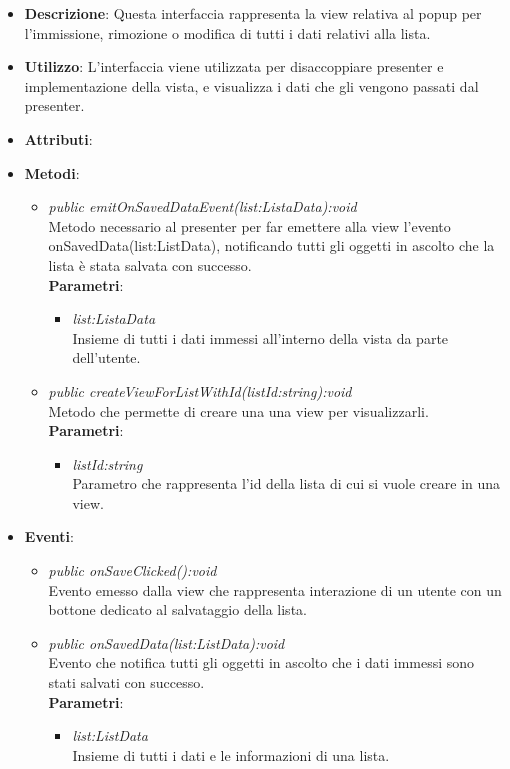 \begin{itemize}
\item \textbf{Descrizione}: Questa interfaccia rappresenta la view relativa al popup per l'immissione, rimozione o modifica di tutti i dati relativi alla lista.
\item \textbf{Utilizzo}: L'interfaccia viene utilizzata per disaccoppiare presenter e implementazione della vista, e visualizza i dati che gli vengono passati dal presenter.
\item \textbf{Attributi}: 
\item \textbf{Metodi}:
	\begin{itemize}	
	\item \textit{public emitOnSavedDataEvent(list:ListaData):void}\\
	Metodo necessario al presenter per far emettere alla view l'evento onSavedData(list:ListData), notificando tutti gli oggetti in ascolto che la lista è stata salvata con successo.
			\\ \textbf{Parametri}: \begin{itemize}
			\item \textit{list:ListaData}\\
			Insieme di tutti i dati immessi all'interno della vista da parte dell'utente.
			\end{itemize} 
	\item \textit{public createViewForListWithId(listId:string):void}\\
	Metodo che permette di creare una una view per visualizzarli.
			\\ \textbf{Parametri}: \begin{itemize}
			\item \textit{listId:string}\\
			Parametro che rappresenta l'id della lista di cui si vuole creare in una view.
			\end{itemize} 
	\end{itemize}
\item \textbf{Eventi}:
	\begin{itemize}
	\item \textit{public onSaveClicked():void}\\
	Evento emesso dalla view che rappresenta interazione di un utente con un bottone dedicato al salvataggio della lista.
	\item \textit{public onSavedData(list:ListData):void}\\
			Evento che notifica tutti gli oggetti in ascolto che i dati immessi sono stati salvati con successo.
			\\ \textbf{Parametri}: \begin{itemize}
			\item \textit{list:ListData}\\
			Insieme di tutti i dati e le informazioni di una lista.
			\end{itemize} 
	\end{itemize}
\end{itemize}

